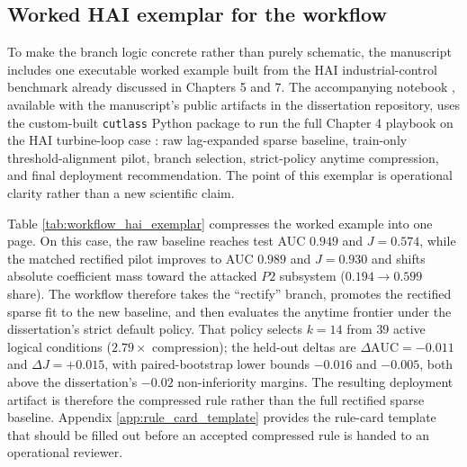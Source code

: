 \subsection{Worked HAI exemplar for the workflow}

To make the branch logic concrete rather than purely schematic, the manuscript includes one executable worked example built from the HAI industrial-control benchmark already discussed in Chapters 5 and 7. The accompanying notebook , available with the manuscript's public artifacts in the dissertation repository, uses the custom-built \texttt{cutlass} Python package to run the full Chapter 4 playbook on the HAI turbine-loop case : raw lag-expanded sparse baseline, train-only threshold-alignment pilot, branch selection, strict-policy anytime compression, and final deployment recommendation. The point of this exemplar is operational clarity rather than a new scientific claim.

Table \ref{tab:workflow_hai_exemplar} compresses the worked example into one page. On this case, the raw baseline reaches test AUC $0.949$ and $J=0.574$, while the matched rectified pilot improves to AUC $0.989$ and $J=0.930$ and shifts absolute coefficient mass toward the attacked $P2$ subsystem ($0.194 \rightarrow 0.599$ share). The workflow therefore takes the ``rectify'' branch, promotes the rectified sparse fit to the new baseline, and then evaluates the anytime frontier under the dissertation's strict default policy. That policy selects $k=14$ from $39$ active logical conditions ($2.79\times$ compression); the held-out deltas are $\Delta \mathrm{AUC}=-0.011$ and $\Delta J=+0.015$, with paired-bootstrap lower bounds $-0.016$ and $-0.005$, both above the dissertation's $-0.02$ non-inferiority margins. The resulting deployment artifact is therefore the compressed rule rather than the full rectified sparse baseline. Appendix \ref{app:rule_card_template} provides the rule-card template that should be filled out before an accepted compressed rule is handed to an operational reviewer.

